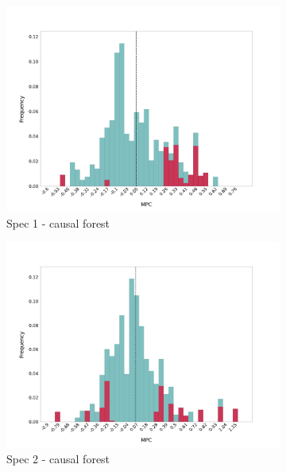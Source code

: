 \begin{figure}[t]
    \begin{subfigure}{0.33\linewidth}
        \includegraphics[width=\linewidth]{figures/distributions/spec1_cf_chFDexp.png}
        \caption{Spec 1 - causal forest }
    \end{subfigure}\hfill
    \begin{subfigure}{0.33\linewidth}
        \includegraphics[width=\linewidth]{figures/distributions/spec2_cf_chFDexp.png}
        \caption{Spec 2 - causal forest }
    \end{subfigure}\hfill
    \begin{subfigure}{0.33\linewidth}

\end{subfigure}
\end{figure}
